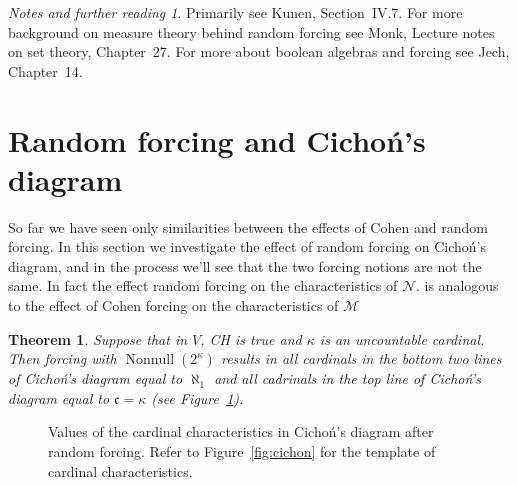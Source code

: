 \documentclass[11pt,oneside]{amsbook}
\newcommand{\Null}{\mathcal N}
\newcommand{\Meager}{\mathcal M}
\DeclareMathOperator{\Nonnull}{Nonnull}
\theoremstyle{definition}
\theoremstyle{plain}
\newtheorem{theorem}{Theorem}[section]
\theoremstyle{definition}
\theoremstyle{remark}
\newtheorem*{notes}{Notes and further reading}
\numberwithin{equation}{section}
\numberwithin{figure}{section}
\begin{document}
\begin{notes}
  Primarily see Kunen, Section~IV.7. For more background on measure theory behind random forcing see Monk, Lecture notes on set theory, Chapter~27. For more about boolean algebras and forcing see Jech, Chapter~14.
\end{notes}


\newpage
\section{Random forcing and Cicho\'n's diagram}

So far we have seen only similarities between the effects of Cohen and random forcing. In this section we investigate the effect of random forcing on Cicho\'n's diagram, and in the process we'll see that the two forcing notions are not the same. In fact the effect random forcing on the characteristics of $\Null$.  is analogous to the effect of Cohen forcing on the characteristics of $\Meager$

\begin{theorem}
  \label{thm:random-cichon}
  Suppose that in $V$, CH is true and $\kappa$ is an uncountable cardinal. Then forcing with $\Nonnull(2^\kappa)$ results in all cardinals in the bottom two lines of Cicho\'n's diagram equal to $\aleph_1$ and all cadrinals in the top line of Cicho\'n's diagram equal to $\mathfrak c=\kappa$ (see Figure~\ref{fig:cichon-random}).
\end{theorem}

\begin{figure}[h]
  \caption{Values of the cardinal characteristics in Cicho\'n's diagram after random forcing. Refer to Figure~\ref{fig:cichon} for the template of cardinal characteristics.\label{fig:cichon-random}}
\end{figure}
\end{document}
